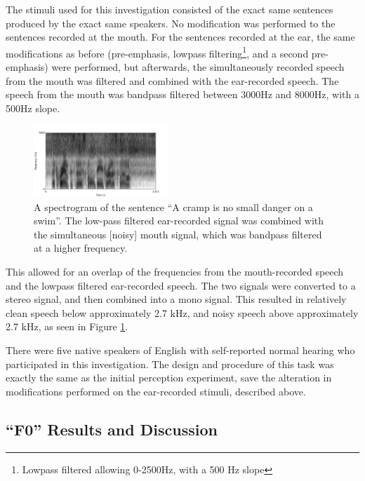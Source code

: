 \documentclass[dissertation,copyright]{uathesis}
\begin{document}
The stimuli used for this investigation consisted of the exact same sentences produced by the exact same speakers.  No modification was performed to the sentences recorded at the mouth.  For the sentences recorded at the ear, the same modifications as before (pre-emphasis, lowpass filtering\footnote{Lowpass filtered allowing 0-2500Hz, with a 500 Hz slope}, and a second pre-emphasis) were performed, but afterwards, the simultaneously recorded speech from the mouth was filtered and combined with the ear-recorded speech.  The speech from the mouth was bandpass filtered between 3000Hz and 8000Hz, with a 500Hz slope.  
%
\begin{figure}
\centering
  \includegraphics[width=0.45\textwidth]{figure/combined-signal.png}
  \caption{A spectrogram of the sentence ``A cramp is no small danger on a swim''.  The low-pass filtered ear-recorded signal was combined with the simultaneous [noisy] mouth signal, which was bandpass filtered at a higher frequency.}
  \label{fig:combined-signal}
\end{figure}
%
This allowed for an overlap of the frequencies from the mouth-recorded speech and the lowpass filtered ear-recorded speech.  The two signals were converted to a stereo signal, and then combined into a mono signal.  This resulted in relatively clean speech below approximately 2.7 kHz, and noisy speech above approximately 2.7 kHz, as seen in Figure \ref{fig:combined-signal}.

There were five native speakers of English with self-reported normal hearing who participated in this investigation.  The design and procedure of this task was exactly the same as the initial perception experiment, save the alteration in modifications performed on the ear-recorded stimuli, described above.


\subsection{``F0'' Results and Discussion}
\label{ch4:F0_discussion}

\end{document}
